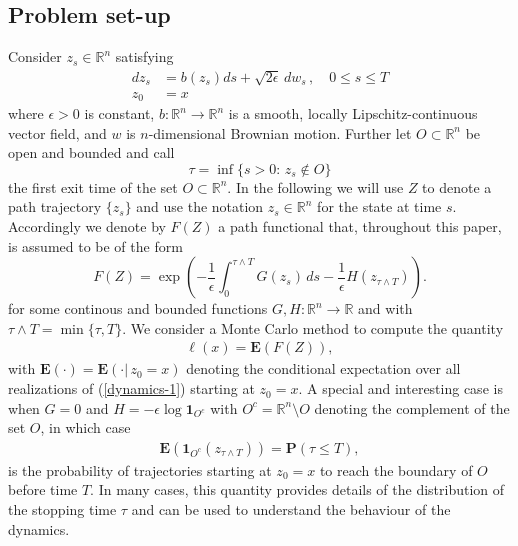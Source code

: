 \documentclass[final]{siamltex}
\newcommand{\R}{{\mathbb R}}
\newcommand{\bE}{{\mathbf E}}
\newcommand{\bP}{{\mathbf P}}
\newcommand{\eps}{\epsilon}
\begin{document}
 
\subsection{Problem set-up}

Consider  $z_s \in \mathbb{R}^n$ satisfying 
\begin{equation}\label{dynamics-1}
\begin{aligned}
  d z_s & =  b(z_s) ds + \sqrt{2\eps }\, dw_s\,, \quad 0\le s\le T\\
  z_{0} & = x
\end{aligned}
\end{equation}
where $\eps>0$ is constant, $b\colon \mathbb{R}^n \to \mathbb{R}^n$ is a smooth, locally Lipschitz-continuous vector field, and $w$ is 
$n$-dimensional Brownian motion. Further let $O \subset \mathbb{R}^n$ be open and bounded and call 
\begin{equation}\label{tau}
\tau = \inf\{s>0\colon \, z_s \notin O\}  
\end{equation}
the first exit time of the set $O\subset\mathbb{R}^n$.
%
In the following we will use $Z$ to denote a path trajectory
$\{z_s\}$ and use the notation $z_s \in \mathbb{R}^n$ for the state at time $s$. 
Accordingly we denote by $F(Z)$ a path functional that, throughout this paper, is assumed to be of the form
\begin{equation}
F(Z) = \exp\left(-\frac{1}{\eps}\int_0^{\tau\wedge T} G(z_s) \,ds - \frac{1}{\eps} H(z_{\tau\wedge T})\right).
  \label{path-fun-f}
\end{equation}
for some continous and bounded functions $G,H\colon\R^{n}\to\R$ and with $\tau\wedge T=\min\{\tau,T\}$. We consider a Monte Carlo method to compute the quantity
\begin{align}
  \ell(x) =\bE(F(Z)),
  \label{mean-l}
\end{align}
with $\bE(\cdot) = \bE(\cdot|\,z_0 = x)$ denoting the conditional expectation over all realizations of (\ref{dynamics-1}) starting at $z_{0}=x$.  
A special and interesting case is when $G = 0$ and $H=-\eps\log{\mathbf 1}_{O^{c}}$ with $O^{c}=\R^{n}\setminus O$ denoting the complement of the set $O$, in which case 
\begin{align}
  \bE({\mathbf 1}_{O^{c}}(z_{\tau\wedge T})) = \bP(\tau\le T),
  \label{mean-chi}
\end{align}
is the probability of trajectories starting at $z_{0}=x$ to reach the boundary of $O$ before time $T$. In many cases, this quantity provides details of the distribution of the stopping time $\tau$ and can be used to understand the behaviour of the dynamics.
\end{document}
